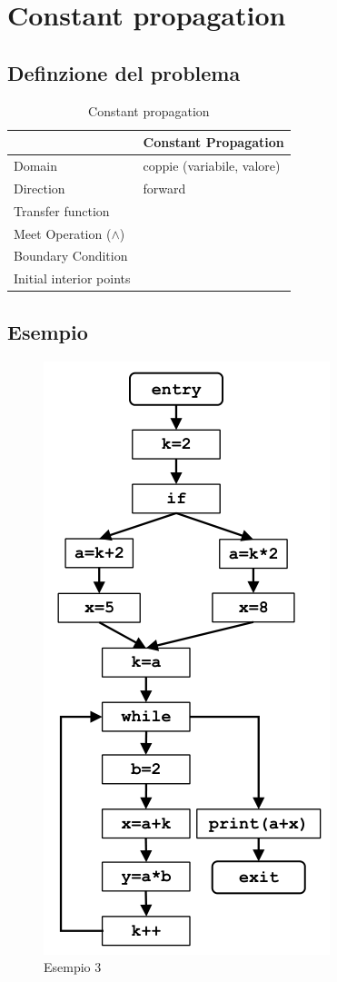 \documentclass[10pt,a4paper]{article}
\begin{document}
\section{Constant propagation}

\subsection{Definzione del problema}

\begin{table}[h!]
  \centering
  \begin{tabular}{|l|p{4cm}|}
    \hline
    \textbf{} & \textbf{Constant Propagation} \\
    \hline
    Domain & coppie (variabile, valore)\\
    \hline
    Direction & forward \\
    \hline
    Transfer function &  \\
    \hline
    Meet Operation (\(\land\)) & \\
    \hline
    Boundary Condition & \\
    \hline
    Initial interior points & \\
    \hline
  \end{tabular}
  \caption{Constant propagation}
\end{table}

\subsection{Esempio}

\begin{figure}[h]
  \centering
  \includegraphics[width=.5\textwidth]{example-3.png}
  \caption{Esempio 3}
\end{figure}
\end{document}
